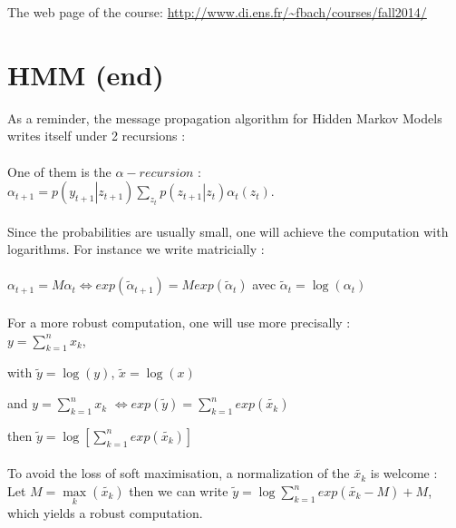 \documentclass[12pt]{report}
\begin{document}
\maketitle

The web page of the course: \url{http://www.di.ens.fr/~fbach/courses/fall2014/}

\section{HMM (end)}
As a reminder, the message propagation algorithm for Hidden Markov Models writes itself under 2 recursions : ~\\
~\\
One of them is the $\alpha - recursion$ : $\alpha_{t + 1} = p \left( y_{t
+ 1} \left| \right. z_{t + 1} \right) \underset{z_t}{\sum} p \left( z_{t + 1}
\left| \right. z_t \right) \alpha_t \left( z_t \right)$.~\\
~\\
Since the probabilities are usually small, one will achieve the computation with logarithms.
For instance we write matricially :~\\
~\\
$\alpha_{t + 1} = M \alpha_t \Leftrightarrow exp ( \tilde{\alpha}_{t + 1} ) = Mexp( \tilde{\alpha}_t )$  avec $\tilde{\alpha}_t = \log (
\alpha_t )$~\\
~\\
For a more robust computation, one will use more precisally :
~\\

$y = \sum_{k=1}^{n} x_k$,

with $\tilde{y} = \log (y)$, $\tilde{x} = \log(x)$

and $y = \sum_{k=1}^{n} x_k$ $\Leftrightarrow
exp \left( \tilde{y} \right) = \sum_{k=1}^{n} exp \left(
\widetilde{x_k} \right)$

then $\tilde{y} = \log [ \sum_{k=1}^{n} exp (
\widetilde{x_k}) ]$~\\
~\\
To avoid the loss of soft maximisation, a normalization of the $\widetilde{x_{k}}$ is welcome : ~\\
Let $M = \max \limits_{k} ( \widetilde{x_{k}} )$ then we can write $\tilde{y} = \log \sum_{k=1}^{n} exp (
\widetilde{x_k} - M ) + M$, which yields a robust computation.
\end{document}
